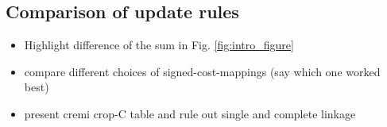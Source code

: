 



\subsection{Comparison of update rules}
\begin{itemize}
  \item Highlight difference of the sum in Fig. \ref{fig:intro_figure}
  \item compare different choices of signed-cost-mappings (say which one worked best)
  \item present cremi crop-C table and rule out single and complete linkage
\end{itemize}




